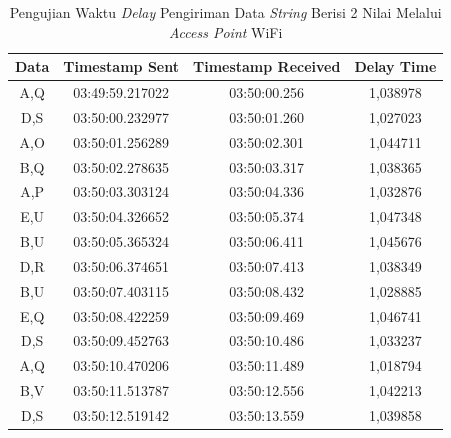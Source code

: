 \begin{table}[htpb]
  \centering
  \caption{Pengujian Waktu \emph{Delay} Pengiriman Data \emph{String} Berisi 2 Nilai Melalui \emph{Access Point} WiFi}
  \label{tbl:delayWiFi2}
  \begin{tabular}{|ccc|c|}
  \hline
  \multicolumn{1}{|c|}{Data} & \multicolumn{1}{c|}{Timestamp Sent}  & Timestamp Received & Delay Time  \\ \hline
  \multicolumn{1}{|c|}{A,Q}  & \multicolumn{1}{c|}{03:49:59.217022} & 03:50:00.256       & 1,038978    \\ \hline
  \multicolumn{1}{|c|}{D,S}  & \multicolumn{1}{c|}{03:50:00.232977} & 03:50:01.260       & 1,027023    \\ \hline
  \multicolumn{1}{|c|}{A,O}  & \multicolumn{1}{c|}{03:50:01.256289} & 03:50:02.301       & 1,044711    \\ \hline
  \multicolumn{1}{|c|}{B,Q}  & \multicolumn{1}{c|}{03:50:02.278635} & 03:50:03.317       & 1,038365    \\ \hline
  \multicolumn{1}{|c|}{A,P}  & \multicolumn{1}{c|}{03:50:03.303124} & 03:50:04.336       & 1,032876    \\ \hline
  \multicolumn{1}{|c|}{E,U}  & \multicolumn{1}{c|}{03:50:04.326652} & 03:50:05.374       & 1,047348    \\ \hline
  \multicolumn{1}{|c|}{B,U}  & \multicolumn{1}{c|}{03:50:05.365324} & 03:50:06.411       & 1,045676    \\ \hline
  \multicolumn{1}{|c|}{D,R}  & \multicolumn{1}{c|}{03:50:06.374651} & 03:50:07.413       & 1,038349    \\ \hline
  \multicolumn{1}{|c|}{B,U}  & \multicolumn{1}{c|}{03:50:07.403115} & 03:50:08.432       & 1,028885    \\ \hline
  \multicolumn{1}{|c|}{E,Q}  & \multicolumn{1}{c|}{03:50:08.422259} & 03:50:09.469       & 1,046741    \\ \hline
  \multicolumn{1}{|c|}{D,S}  & \multicolumn{1}{c|}{03:50:09.452763} & 03:50:10.486       & 1,033237    \\ \hline
  \multicolumn{1}{|c|}{A,Q}  & \multicolumn{1}{c|}{03:50:10.470206} & 03:50:11.489       & 1,018794    \\ \hline
  \multicolumn{1}{|c|}{B,V}  & \multicolumn{1}{c|}{03:50:11.513787} & 03:50:12.556       & 1,042213    \\ \hline
  \multicolumn{1}{|c|}{D,S}  & \multicolumn{1}{c|}{03:50:12.519142} & 03:50:13.559       & 1,039858    \\ \hline

\end{tabular}
\end{table}
